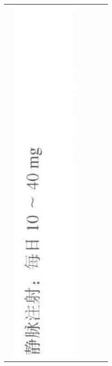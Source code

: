 \documentclass[10pt]{article}
\begin{document}
\begin{center}
\begin{tabular}{|c|c|c|c|c|c|}
 & \includegraphics[max width=\textwidth]{2024_07_05_645bb794a4d4f32ee0c8g-352(2)}

\end{tabular}
\end{center}
\end{document}
